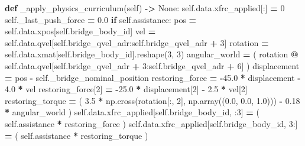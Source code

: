 \documentclass[
  american,
  11pt,
  letterpaper,
]{article}
\newenvironment{Shaded}{\begin{snugshade}}{\end{snugshade}}
\newcommand{\ControlFlowTok}[1]{\textcolor[rgb]{0.13,0.29,0.53}{\textbf{#1}}}
\newcommand{\DecValTok}[1]{\textcolor[rgb]{0.00,0.00,0.81}{#1}}
\newcommand{\FloatTok}[1]{\textcolor[rgb]{0.00,0.00,0.81}{#1}}
\newcommand{\KeywordTok}[1]{\textcolor[rgb]{0.13,0.29,0.53}{\textbf{#1}}}
\newcommand{\NormalTok}[1]{#1}
\newcommand{\OperatorTok}[1]{\textcolor[rgb]{0.81,0.36,0.00}{\textbf{#1}}}
\newcommand{\VariableTok}[1]{\textcolor[rgb]{0.00,0.00,0.00}{#1}}
\renewenvironment{Shaded}{\par\smallskip}{\par\smallskip}
\begin{document}
\begin{Shaded}
\begin{Highlighting}[]
    \KeywordTok{def}\NormalTok{ \_apply\_physics\_curriculum(}\VariableTok{self}\NormalTok{) }\OperatorTok{{-}\textgreater{}} \VariableTok{None}\NormalTok{:}
        \VariableTok{self}\NormalTok{.data.xfrc\_applied[:] }\OperatorTok{=} \DecValTok{0}
        \VariableTok{self}\NormalTok{.\_last\_push\_force }\OperatorTok{=} \FloatTok{0.0}
        \ControlFlowTok{if} \VariableTok{self}\NormalTok{.assistance:}
\NormalTok{            pos }\OperatorTok{=} \VariableTok{self}\NormalTok{.data.xpos[}\VariableTok{self}\NormalTok{.bridge\_body\_id]}
\NormalTok{            vel }\OperatorTok{=} \VariableTok{self}\NormalTok{.data.qvel[}\VariableTok{self}\NormalTok{.bridge\_qvel\_adr:}\VariableTok{self}\NormalTok{.bridge\_qvel\_adr }\OperatorTok{+} \DecValTok{3}\NormalTok{]}
\NormalTok{            rotation }\OperatorTok{=} \VariableTok{self}\NormalTok{.data.xmat[}\VariableTok{self}\NormalTok{.bridge\_body\_id].reshape(}\DecValTok{3}\NormalTok{, }\DecValTok{3}\NormalTok{)}
\NormalTok{            angular\_world }\OperatorTok{=}\NormalTok{ (}
\NormalTok{                rotation}
                \OperatorTok{@} \VariableTok{self}\NormalTok{.data.qvel[}\VariableTok{self}\NormalTok{.bridge\_qvel\_adr }\OperatorTok{+} \DecValTok{3}\NormalTok{:}\VariableTok{self}\NormalTok{.bridge\_qvel\_adr }\OperatorTok{+} \DecValTok{6}\NormalTok{]}
\NormalTok{            )}
\NormalTok{            displacement }\OperatorTok{=}\NormalTok{ pos }\OperatorTok{{-}} \VariableTok{self}\NormalTok{.\_bridge\_nominal\_position}
\NormalTok{            restoring\_force }\OperatorTok{=} \OperatorTok{{-}}\FloatTok{45.0} \OperatorTok{*}\NormalTok{ displacement }\OperatorTok{{-}} \FloatTok{4.0} \OperatorTok{*}\NormalTok{ vel}
\NormalTok{            restoring\_force[}\DecValTok{2}\NormalTok{] }\OperatorTok{=} \OperatorTok{{-}}\FloatTok{25.0} \OperatorTok{*}\NormalTok{ displacement[}\DecValTok{2}\NormalTok{] }\OperatorTok{{-}} \FloatTok{2.5} \OperatorTok{*}\NormalTok{ vel[}\DecValTok{2}\NormalTok{]}
\NormalTok{            restoring\_torque }\OperatorTok{=}\NormalTok{ (}
                \FloatTok{3.5} \OperatorTok{*}\NormalTok{ np.cross(rotation[:, }\DecValTok{2}\NormalTok{], np.array((}\FloatTok{0.0}\NormalTok{, }\FloatTok{0.0}\NormalTok{, }\FloatTok{1.0}\NormalTok{)))}
                \OperatorTok{{-}} \FloatTok{0.18} \OperatorTok{*}\NormalTok{ angular\_world}
\NormalTok{            )}
            \VariableTok{self}\NormalTok{.data.xfrc\_applied[}\VariableTok{self}\NormalTok{.bridge\_body\_id, :}\DecValTok{3}\NormalTok{] }\OperatorTok{=}\NormalTok{ (}
                \VariableTok{self}\NormalTok{.assistance }\OperatorTok{*}\NormalTok{ restoring\_force}
\NormalTok{            )}
            \VariableTok{self}\NormalTok{.data.xfrc\_applied[}\VariableTok{self}\NormalTok{.bridge\_body\_id, }\DecValTok{3}\NormalTok{:] }\OperatorTok{=}\NormalTok{ (}
                \VariableTok{self}\NormalTok{.assistance }\OperatorTok{*}\NormalTok{ restoring\_torque}
\NormalTok{            )}


\end{Highlighting}
\end{Shaded}
\end{document}
